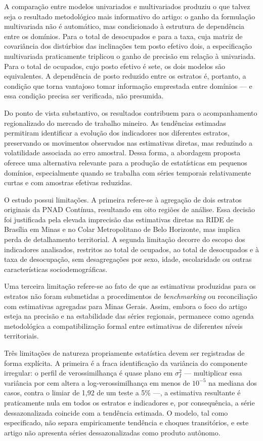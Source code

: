 \documentclass[rbe,wwwview]{econbr}
\begin{document}
A comparação entre modelos univariados e multivariados produziu o que talvez seja o resultado metodológico mais informativo do artigo: o ganho da formulação multivariada não é automático, mas condicionado à estrutura de dependência entre os domínios. Para o total de desocupados e para a taxa, cuja matriz de covariância dos distúrbios das inclinações tem posto efetivo dois, a especificação multivariada praticamente triplicou o ganho de precisão em relação à univariada. Para o total de ocupados, cujo posto efetivo é sete, os dois modelos são equivalentes. A dependência de posto reduzido entre os estratos é, portanto, a condição que torna vantajoso tomar informação emprestada entre domínios --- e essa condição precisa ser verificada, não presumida.

Do ponto de vista substantivo, os resultados contribuem para o acompanhamento regionalizado do mercado de trabalho mineiro. As tendências estimadas permitiram identificar a evolução dos indicadores nos diferentes estratos, preservando os movimentos observados nas estimativas diretas, mas reduzindo a volatilidade associada ao erro amostral. Dessa forma, a abordagem proposta oferece uma alternativa relevante para a produção de estatísticas em pequenos domínios, especialmente quando se trabalha com séries temporais relativamente curtas e com amostras efetivas reduzidas.

O estudo possui limitações. A primeira refere-se à agregação de dois estratos originais da PNAD Contínua, resultando em oito regiões de análise. Essa decisão foi justificada pela elevada imprecisão das estimativas diretas na RIDE de Brasília em Minas e no Colar Metropolitano de Belo Horizonte, mas implica perda de detalhamento territorial. A segunda limitação decorre do escopo dos indicadores analisados, restritos ao total de ocupados, ao total de desocupados e à taxa de desocupação, sem desagregações por sexo, idade, escolaridade ou outras características sociodemográficas.

Uma terceira limitação refere-se ao fato de que as estimativas produzidas para os estratos não foram submetidas a procedimentos de \textit{benchmarking} ou reconciliação com estimativas agregadas para Minas Gerais. Assim, embora o foco do artigo esteja na precisão e na estabilidade das séries regionais, permanece como agenda metodológica a compatibilização formal entre estimativas de diferentes níveis territoriais.

Três limitações de natureza propriamente estatística devem ser registradas de forma explícita. A primeira é a fraca identificação da variância do componente irregular: o perfil de verossimilhança é quase plano em \(\sigma_I^2\) --- multiplicar essa variância por cem altera a log-verossimilhança em menos de \(10^{-5}\) na mediana dos casos, contra o limiar de 1,92 de um teste a 5\% ---, a estimativa resultante é praticamente nula em todos os estratos e indicadores e, por consequência, a série dessazonalizada coincide com a tendência estimada. O modelo, tal como especificado, não separa empiricamente tendência e choques transitórios, e este artigo não apresenta séries dessazonalizadas como produto autônomo.
\end{document}
